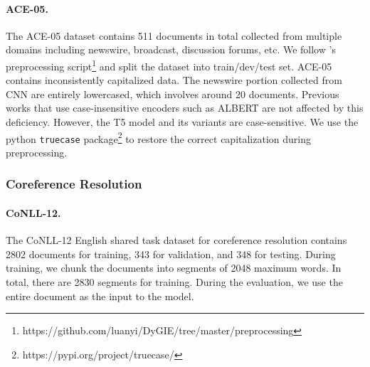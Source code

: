 \documentclass[11pt]{article}
\begin{document}
\paragraph{ACE-05.}
The ACE-05 dataset \cite{walker2005ace} contains 511 documents in total collected from multiple domains including newswire, broadcast, discussion forums, etc. We follow \citet{luan-etal-2019-general}'s preprocessing script\footnote{https://github.com/luanyi/DyGIE/tree/master/preprocessing} and split the dataset into train/dev/test set.
ACE-05 contains inconsistently capitalized data. The newswire portion collected from CNN are entirely lowercased, which involves around 20 documents. Previous works \cite{zhong-chen-2021-frustratingly,ye-etal-2022-packed} that use case-insensitive encoders such as ALBERT are not affected by this deficiency. 
However, the T5 model and its variants are case-sensitive. We use the python \texttt{truecase} package\footnote{https://pypi.org/project/truecase/} to restore the correct capitalization during preprocessing.


\subsubsection{Coreference Resolution}
\paragraph{CoNLL-12.}
The CoNLL-12 English shared task dataset for coreference resolution \cite{pradhan-etal-2012-conll} contains 2802 documents for training, 343 for validation, and 348 for testing. 
During training, we chunk the documents into segments of 2048 maximum words. 
In total, there are 2830 segments for training.
During the evaluation, we use the entire document as the input to the model.
\end{document}
